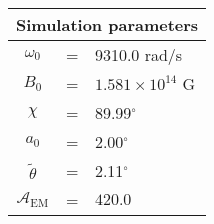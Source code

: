 \begin{tabular}{ccl}
\multicolumn{3}{c}{Simulation parameters} \\
\hline
$\omega_0$  &=& 9310.0 rad/s\\
$B_0$  &=& ${1.581}\times 10^{14}$ G \\
$\chi$  &=& 89.99$^{\circ}$ \\
$a_0$ &=& 2.00$^{\circ}$ \\
$\tilde{\theta}$ &= & 2.11$^{\circ}$ \\
$\mathcal{A}_{\mathrm{EM}}$ &= & $420.0$
\end{tabular}